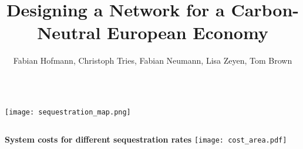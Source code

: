 \documentclass[12pt, aspectratio=169]{beamer}
\title{Designing a \carbon{} Network for a Carbon-Neutral European Economy}
\author{Fabian Hofmann, Christoph Tries, Fabian Neumann, Lisa Zeyen, Tom Brown}
\institute{Technical University Berlin}
\date{}
\begin{document}
\begin{frame}[plain]
\titlepage
\end{frame}

\begin{frame}[plain]
\begin{columns}
\texttt{[image: sequestration\_map.png]}
\end{columns}
\end{frame}

\begin{frame}[plain]
\qquad \textbf{System costs for different sequestration rates}
\texttt{[image: cost\_area.pdf]}
\end{frame}
\end{document}
